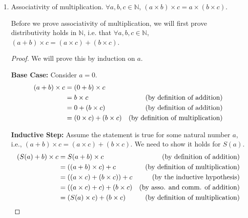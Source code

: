\documentclass[10pt]{article}
\newcommand{\N}{\mathbb{N}}
\newenvironment{problem}[2][Problem]{\begin{trivlist}
\item[\hskip \labelsep {\bfseries #1}\hskip \labelsep {\bfseries #2.}]}{\end{trivlist}}
\begin{document}
\begin{problem}{1}
\begin{enumerate}
\begin{enumerate}
\begin{proof}
                        Therefore, the inductive step holds, completing the proof.
                        
                    \end{proof}

				\item Associativity of multiplication. $\forall a, b, c \in \N$, $(a \times b) \times c = a \times (b \times c)$.

                    Before we prove associativity of multiplication, we will first prove distributivity holds in $\N$, i.e. that  $\forall a, b, c \in \N$, $(a + b) \times c = (a \times c) + (b \times c)$.
                    \begin{proof}
                        We will prove this by induction on \( a \).

                        \textbf{Base Case:} Consider \( a = 0 \).
                        \begin{align*}
                            (a + b) \times c &= (0 + b) \times c \\
                                             &= b \times c & \text{(by definition of addition)} \hfill \\
                                             &= 0 + (b \times c) & \text{(by definition of addition)} \hfill \\
                                             &= (0 \times c) + (b \times c) & \text{(by definition of multiplication)} \hfill
                        \end{align*}

                        \textbf{Inductive Step:} Assume the statement is true for some natural number \( a \), i.e., \( (a + b) \times c = (a \times c) + (b \times c) \). We need to show it holds for \( S(a) \).
                        \begin{align*}
                            (S(a) + b) \times c &= S(a + b) \times c & \text{(by definition of addition)} \hfill \\
                                               &= ((a + b) \times c) + c & \text{(by definition of multiplication)} \hfill \\
                                               &= ((a \times c) + (b \times c)) + c & \text{(by the inductive hypothesis)} \hfill \\
                                               &= ((a \times c) + c) + (b \times c) & \text{(by asso. and comm. of addition)} \hfill \\
                                               &= (S(a) \times c) + (b \times c) & \text{(by definition of multiplication)} \hfill
                        \end{align*}


\end{proof}
\end{enumerate}
\end{enumerate}
\end{problem}
\end{document}
